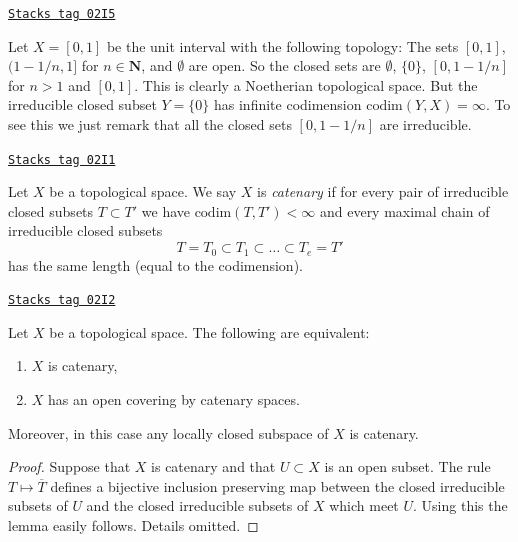 \begin{example}
\label{topology-example-Noetherian-infinite-codimension}
\href{https://stacks.math.columbia.edu/tag/02I5}{\texttt{Stacks tag 02I5}}

Let $X = [0, 1]$ be the unit interval with the following
topology: The sets $[0, 1]$, $(1 - 1/n, 1]$ for $n \in \mathbf{N}$, and
$\emptyset$ are open. So the closed sets are
$\emptyset$, $\{0\}$, $[0, 1 - 1/n]$ for $n > 1$ and $[0, 1]$.
This is clearly a Noetherian topological space.
But the irreducible closed subset $Y = \{0\}$ has infinite
codimension $\text{codim}(Y, X) = \infty$.
To see this we just remark that all the closed sets
$[0, 1 - 1/n]$ are irreducible.
\end{example}

\begin{definition}[Catenary]
\label{topology-definition-catenary}
\href{https://stacks.math.columbia.edu/tag/02I1}{\texttt{Stacks tag 02I1}}

Let $X$ be a topological space. We say $X$ is {\it catenary} if
for every pair of irreducible closed subsets $T \subset T'$
we have $\text{codim}(T, T') < \infty$ and every maximal chain
of irreducible closed subsets
$$
T = T_0 \subset T_1 \subset \ldots \subset T_e = T'
$$
has the same length (equal to the codimension).
\end{definition}

\begin{lemma}[Catenary]
\label{topology-lemma-catenary}
\href{https://stacks.math.columbia.edu/tag/02I2}{\texttt{Stacks tag 02I2}}

Let $X$ be a topological space.
The following are equivalent:
\begin{enumerate}
\item $X$ is catenary,
\item $X$ has an open covering by catenary spaces.
\end{enumerate}
Moreover, in this case any locally closed subspace of $X$ is catenary.
\end{lemma}

\begin{proof}
Suppose that $X$ is catenary and that $U \subset X$ is an open
subset. The rule $T \mapsto \overline{T}$ defines a bijective
inclusion preserving map between the closed irreducible subsets
of $U$ and the closed irreducible subsets of $X$ which meet $U$.
Using this the lemma easily follows. Details omitted.
\end{proof}

